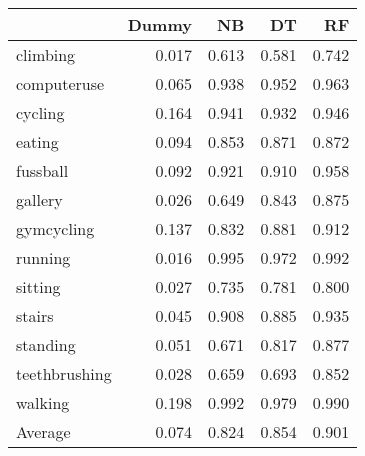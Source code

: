 \begin{tabular}{lrrrr}
\toprule
{} &  Dummy &    NB &    DT &    RF \\
\midrule
climbing      &  0.017 & 0.613 & 0.581 & 0.742 \\
computeruse   &  0.065 & 0.938 & 0.952 & 0.963 \\
cycling       &  0.164 & 0.941 & 0.932 & 0.946 \\
eating        &  0.094 & 0.853 & 0.871 & 0.872 \\
fussball      &  0.092 & 0.921 & 0.910 & 0.958 \\
gallery       &  0.026 & 0.649 & 0.843 & 0.875 \\
gymcycling    &  0.137 & 0.832 & 0.881 & 0.912 \\
running       &  0.016 & 0.995 & 0.972 & 0.992 \\
sitting       &  0.027 & 0.735 & 0.781 & 0.800 \\
stairs        &  0.045 & 0.908 & 0.885 & 0.935 \\
standing      &  0.051 & 0.671 & 0.817 & 0.877 \\
teethbrushing &  0.028 & 0.659 & 0.693 & 0.852 \\
walking       &  0.198 & 0.992 & 0.979 & 0.990 \\
Average       &  0.074 & 0.824 & 0.854 & 0.901 \\
\bottomrule
\end{tabular}
